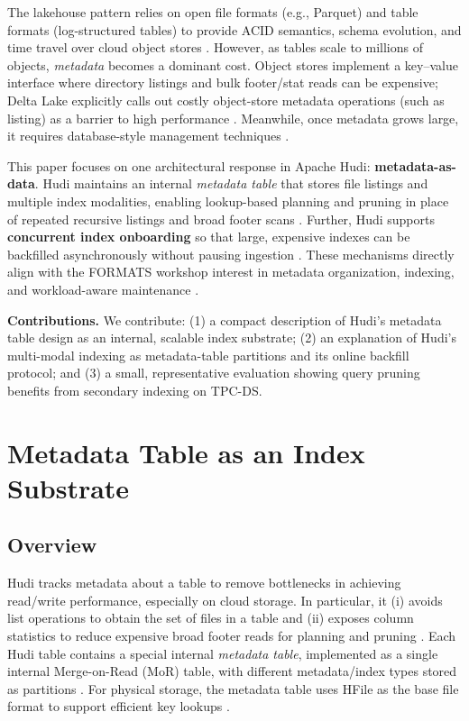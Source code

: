 \documentclass[sigconf]{acmart}
\begin{document}
The lakehouse pattern relies on open file formats (e.g., Parquet) and table formats (log-structured tables) to provide ACID semantics, schema evolution, and time travel over cloud object stores \cite{armbrust2021lakehouse,camacho2024lstbench}.
However, as tables scale to millions of objects, \emph{metadata} becomes a dominant cost.
Object stores implement a key--value interface where directory listings and bulk footer/stat reads can be expensive; Delta Lake explicitly calls out costly object-store metadata operations (such as listing) as a barrier to high performance \cite{armbrust2020deltalake}.
Meanwhile, once metadata grows large, it requires database-style management techniques \cite{edara2021bigmetadata}.

This paper focuses on one architectural response in Apache Hudi: \textbf{metadata-as-data}.
Hudi maintains an internal \emph{metadata table} that stores file listings and multiple index modalities, enabling lookup-based planning and pruning in place of repeated recursive listings and broad footer scans \cite{hudi-metadata}.
Further, Hudi supports \textbf{concurrent index onboarding} so that large, expensive indexes can be backfilled asynchronously without pausing ingestion \cite{hudi-indexing}.
These mechanisms directly align with the FORMATS workshop interest in metadata organization, indexing, and workload-aware maintenance \cite{formats2026cfp}.

\textbf{Contributions.} We contribute:
(1) a compact description of Hudi's metadata table design as an internal, scalable index substrate;
(2) an explanation of Hudi's multi-modal indexing as metadata-table partitions and its online backfill protocol; and
(3) a small, representative evaluation showing query pruning benefits from secondary indexing on TPC-DS.

\section{Metadata Table as an Index Substrate}

\subsection{Overview}
Hudi tracks metadata about a table to remove bottlenecks in achieving read/write performance, especially on cloud storage.
In particular, it (i) avoids list operations to obtain the set of files in a table and (ii) exposes column statistics to reduce expensive broad footer reads for planning and pruning \cite{hudi-metadata}.
Each Hudi table contains a special internal \emph{metadata table}, implemented as a single internal Merge-on-Read (MoR) table, with different metadata/index types stored as partitions \cite{hudi-metadata}.
For physical storage, the metadata table uses HFile as the base file format to support efficient key lookups \cite{hudi-metadata}.
\end{document}
